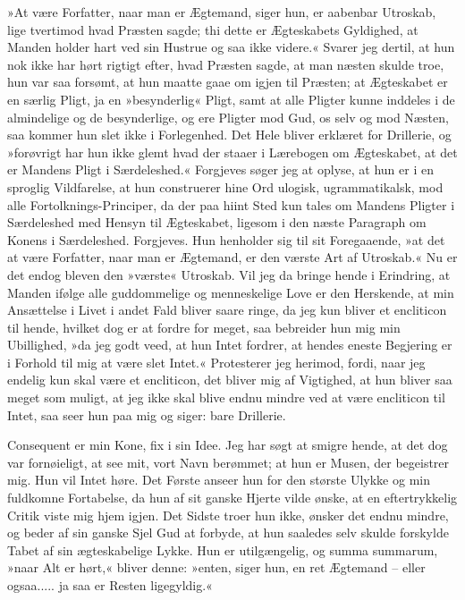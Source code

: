\documentclass[12pt,a4paper]{article}
\begin{document}
»At være Forfatter, naar man er Ægtemand, siger hun, er aabenbar Utroskab, lige tvertimod hvad Præsten sagde; thi dette er Ægteskabets Gyldighed, at Manden holder hart ved sin Hustrue og saa ikke videre.« Svarer jeg dertil, at hun nok ikke har hørt rigtigt efter, hvad Præsten sagde, at man næsten skulde troe, hun var saa forsømt, at hun maatte gaae om igjen til Præsten; at Ægteskabet er en særlig Pligt, ja en »besynderlig« Pligt, samt at alle Pligter kunne inddeles i de almindelige og de besynderlige, og ere Pligter mod Gud, os selv og mod Næsten, saa kommer hun slet ikke i Forlegenhed. Det Hele bliver erklæret for Drillerie, og »forøvrigt har hun ikke glemt hvad der staaer i Lærebogen om Ægteskabet, at det er Mandens Pligt i Særdeleshed.« Forgjeves søger jeg at oplyse, at hun er i en sproglig Vildfarelse, at hun construerer hine Ord ulogisk, ugrammatikalsk, mod alle Fortolknings-Principer, da der paa hiint Sted kun tales om Mandens Pligter i Særdeleshed med Hensyn til Ægteskabet, ligesom i den næste Paragraph om Konens i Særdeleshed. Forgjeves. Hun henholder sig til sit Foregaaende, »at det at være Forfatter, naar man er Ægtemand, er den værste Art af Utroskab.« Nu er det endog bleven den »værste« Utroskab. Vil jeg da bringe hende i Erindring, at Manden ifølge alle guddommelige og menneskelige Love er den Herskende, at min Ansættelse i Livet i andet Fald bliver saare ringe, da jeg kun bliver et encliticon til hende, hvilket dog er at fordre for meget, saa bebreider hun mig min Ubillighed, »da jeg godt veed, at hun Intet fordrer, at hendes eneste Begjering er i Forhold til mig at være slet Intet.« Protesterer jeg herimod, fordi, naar jeg endelig kun skal være et encliticon, det bliver mig af Vigtighed, at hun bliver saa meget som muligt, at jeg ikke skal blive endnu mindre ved at være encliticon til Intet, saa seer hun paa mig og siger: bare Drillerie.

Consequent er min Kone, fix i sin Idee. Jeg har søgt at smigre hende, at det dog var fornøieligt, at see mit, vort Navn berømmet; at hun er Musen, der begeistrer mig. Hun vil Intet høre. Det Første anseer hun for den største Ulykke og min fuldkomne Fortabelse, da hun af sit ganske Hjerte vilde ønske, at en eftertrykkelig Critik viste mig hjem igjen. Det Sidste troer hun ikke, ønsker det endnu mindre, og beder af sin ganske Sjel Gud at forbyde, at hun saaledes selv skulde forskylde Tabet af sin ægteskabelige Lykke. Hun er utilgængelig, og summa summarum, »naar Alt er hørt,« bliver denne: »enten, siger hun, en ret Ægtemand – eller ogsaa..... ja saa er Resten ligegyldig.«
\end{document}
